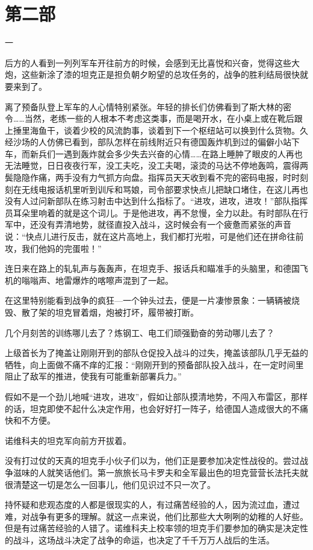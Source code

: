 \section{ 第二部}


一

后方的人看到一列列军车开往前方的时候，会感到无比喜悦和兴奋，觉得这些大炮，这些新涂了漆的坦克正是担负朝夕盼望的总攻任务的，战争的胜利结局很快就要来到了。

离了预备队登上军车的人心情特别紧张。年轻的排长们仿佛看到了斯大林的密令……当然，老练一些的人根本不考虑这类事，而是喝开水，在小桌上或在靴后跟上捶里海鱼干，谈着少校的风流韵事，谈着到下一个枢纽站可以换到什么货物。久经沙场的人仿佛已看到，部队怎样在前线附近只有德国轰炸机到过的偏僻小站下车，而新兵们一遇到轰炸就会多少失去兴奋的心情……在路上睡肿了眼皮的人再也无法睡觉，日日夜夜行军，没工夫吃，没工夫喝，滚烫的马达不停地轰鸣，震得两鬓隐隐作痛，两手没有力气抓方向盘。指挥员天天收到看不完的密码电报，时时刻刻在无线电报话机里听到训斥和骂娘，司令部要求快点儿把缺口堵住，在这儿再也没有人过问新部队在练习射击中达到什么指标了。“进攻，进攻，进攻！”部队指挥员耳朵里响着的就是这个词儿。于是他进攻，再不怠慢，全力以赴。有时部队在行军中，还没有弄清地势，就径直投入战斗，这时候会有一个疲惫而紧张的声音说：“快点儿进行反击，就在这片高地上，我们都打光啦，可是他们还在拼命往前攻，我们他妈的完蛋啦！”

连日来在路上的轧轧声与轰轰声，在坦克手、报话兵和瞄准手的头脑里，和德国飞机的嗡嗡声、地雷爆炸的喀嚓声混到了一起。

在这里特别能看到战争的疯狂—一个钟头过去，便是一片凄惨景象：一辆辆被烧毁、散了架的坦克冒着烟，炮被打坏，履带被打断。

几个月刻苦的训练哪儿去了？炼钢工、电工们顽强勤奋的劳动哪儿去了？

上级首长为了掩盖让刚刚开到的部队仓促投入战斗的过失，掩盖该部队几乎无益的牺牲，向上面做不痛不痒的汇报：“刚刚开到的预备部队投入战斗，在一定时间里阻止了敌军的推进，使我有可能重新部署兵力。”

假如不是一个劲儿地喊“进攻，进攻”，假如让部队摸清地势，不闯入布雷区，那样的话，坦克即使不起什么决定作用，也会好好打一阵子，给德国人造成很大的不痛快和不方便。

诺维科夫的坦克军向前方开拔着。

没有打过仗的天真的坦克手小伙子们以为，他们正是要参加决定性战役的。尝过战争滋味的人就笑话他们。第一旅旅长马卡罗夫和全军最出色的坦克营营长法托夫就很清楚这一切是怎么一回事儿，他们见识过不只一次了。

持怀疑和悲观态度的人都是很现实的人，有过痛苦经验的人，因为流过血，遭过难，对战争有更多的理解。就这一点来说，他们比那些大大咧咧的幼稚的人好些。但是有过痛苦经验的人错了。诺维科夫上校率领的坦克手们要参加的确实是决定性的战斗，这场战斗决定了战争的命运，也决定了千千万万人战后的生活。

